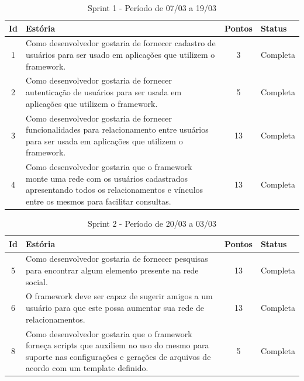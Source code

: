 \begin{apendicesenv}
\begin{table}[!h]
\centering
\caption{Sprint 1 - Período de 07/03 a 19/03}
\label{sprint_1}
\begin{adjustbox}{width=\textwidth}
\begin{tabular}{@{}cp{10cm}cl@{}}
\toprule
\textbf{Id}  & \textbf{Estória} & \textbf{Pontos} & \textbf{Status} \\ \midrule
1 & Como desenvolvedor gostaria de fornecer cadastro de usuários para ser usado em aplicações que utilizem o framework. & 3 & Completa \\

2 & Como desenvolvedor gostaria de fornecer autenticação de usuários para ser usada em aplicações que utilizem o framework. & 5 & Completa \\

3 & Como desenvolvedor gostaria de fornecer funcionalidades para relacionamento entre usuários para ser usada em aplicações que utilizem o framework. & 13 & Completa \\

4 & Como desenvolvedor gostaria que o framework monte uma rede com os usuários cadastrados apresentando todos os relacionamentos e vínculos entre os mesmos para facilitar consultas. & 13 & Completa \\ \bottomrule
\end{tabular}
\end{adjustbox}
\end{table}

\begin{table}[!h]
\centering
\caption{Sprint 2 - Período de 20/03 a 03/03}
\label{sprint_2}
\begin{adjustbox}{width=\textwidth}
\begin{tabular}{@{}cp{10cm}cl@{}}
\toprule
\textbf{Id}  & \textbf{Estória} & \textbf{Pontos} & \textbf{Status} \\ \midrule
5 & Como desenvolvedor gostaria de fornecer pesquisas para encontrar algum elemento presente na rede social. & 13 & Completa \\

6 & O framework deve ser capaz de sugerir amigos a um usuário para que este possa aumentar sua rede de relacionamentos. & 13 & Completa \\

8 & Como desenvolvedor gostaria que o framework forneça scripts que auxiliem no uso do mesmo para suporte nas configurações e gerações de arquivos de acordo com um template definido. & 5 & Completa \\


\end{tabular}
\end{adjustbox}
\end{table}
\end{apendicesenv}
